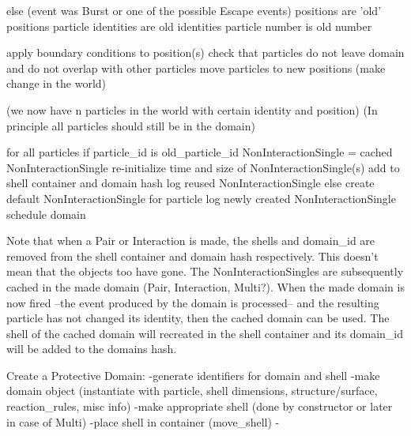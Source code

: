 \documentclass[a4paper, 11pt]{article}
\begin{document}
  else
    (event was Burst or one of the possible Escape events)
    positions are 'old' positions
    particle identities are old identities
    particle number is old number

    apply boundary conditions to position(s)
    check that particles do not leave domain and do not overlap with other particles
    move particles to new positions (make change in the world)

  (we now have n particles in the world with certain identity and position)
  (In principle all particles should still be in the domain)

  for all particles
    if particle\_id is old\_particle\_id
      NonInteractionSingle = cached NonInteractionSingle
      re-initialize time and size of NonInteractionSingle(s)
      add to shell container and domain hash
      log reused NonInteractionSingle
    else
      create default NonInteractionSingle for particle
      log newly created NonInteractionSingle
    schedule domain



Note that when a Pair or Interaction is made, the shells and domain\_id are removed from the shell container and
domain hash respectively. This doesn't mean that the objects too have gone. The NonInteractionSingles are subsequently
cached in the made domain (Pair, Interaction, Multi?). When the made domain is now fired --the event produced by the
domain is processed-- and the resulting particle has not changed its identity, then the cached domain can be used. The
shell of the cached domain will recreated in the shell container and its domain\_id will be added to the domains hash.



Create a Protective Domain:
-generate identifiers for domain and shell
-make domain object (instantiate with particle, shell dimensions, structure/surface, reaction\_rules, misc info)
 -make appropriate shell (done by constructor or later in case of Multi)
-place shell in container (move\_shell)
-
\end{document}
